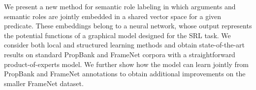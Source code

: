 We present a new method for semantic role labeling in which arguments and semantic roles are jointly embedded in a shared vector space for a given predicate. These embeddings belong to a neural network, whose output represents the potential functions of a graphical model designed for the SRL task. We consider both local and structured learning methods and obtain state-of-the-art results on standard PropBank and FrameNet corpora with a straightforward product-of-experts model. We further show how the model can learn jointly from PropBank and FrameNet annotations to obtain additional improvements on the smaller FrameNet dataset.
